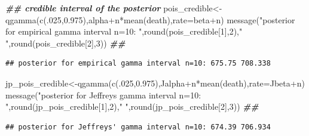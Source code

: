 \documentclass[
]{book}
\newenvironment{Shaded}{\begin{snugshade}}{\end{snugshade}}
\newcommand{\AttributeTok}[1]{\textcolor[rgb]{0.77,0.63,0.00}{#1}}
\newcommand{\DecValTok}[1]{\textcolor[rgb]{0.00,0.00,0.81}{#1}}
\newcommand{\DocumentationTok}[1]{\textcolor[rgb]{0.56,0.35,0.01}{\textbf{\textit{#1}}}}
\newcommand{\FloatTok}[1]{\textcolor[rgb]{0.00,0.00,0.81}{#1}}
\newcommand{\FunctionTok}[1]{\textcolor[rgb]{0.00,0.00,0.00}{#1}}
\newcommand{\NormalTok}[1]{#1}
\newcommand{\OtherTok}[1]{\textcolor[rgb]{0.56,0.35,0.01}{#1}}
\newcommand{\SpecialCharTok}[1]{\textcolor[rgb]{0.00,0.00,0.00}{#1}}
\newcommand{\StringTok}[1]{\textcolor[rgb]{0.31,0.60,0.02}{#1}}
\theoremstyle{definition}
\theoremstyle{definition}
\theoremstyle{definition}
\theoremstyle{definition}
\theoremstyle{remark}
\begin{document}
\begin{Shaded}
\begin{Highlighting}[]
 \DocumentationTok{\#\# credible interval of the posterior}
\NormalTok{ pois\_credible}\OtherTok{\textless{}{-}}\FunctionTok{qgamma}\NormalTok{(}\FunctionTok{c}\NormalTok{(.}\DecValTok{025}\NormalTok{,}\FloatTok{0.975}\NormalTok{),alpha}\SpecialCharTok{+}\NormalTok{n}\SpecialCharTok{*}\FunctionTok{mean}\NormalTok{(death),}\AttributeTok{rate=}\NormalTok{beta}\SpecialCharTok{+}\NormalTok{n)}
 \FunctionTok{message}\NormalTok{(}\StringTok{"posterior for empirical gamma interval n=10: "}\NormalTok{,}\FunctionTok{round}\NormalTok{(pois\_credible[}\DecValTok{1}\NormalTok{],}\DecValTok{2}\NormalTok{),}\StringTok{" "}\NormalTok{,}\FunctionTok{round}\NormalTok{(pois\_credible[}\DecValTok{2}\NormalTok{],}\DecValTok{3}\NormalTok{)) }\DocumentationTok{\#\# }
\end{Highlighting}
\end{Shaded}

\begin{verbatim}
## posterior for empirical gamma interval n=10: 675.75 708.338
\end{verbatim}

\begin{Shaded}
\begin{Highlighting}[]
\NormalTok{ jp\_pois\_credible}\OtherTok{\textless{}{-}}\FunctionTok{qgamma}\NormalTok{(}\FunctionTok{c}\NormalTok{(.}\DecValTok{025}\NormalTok{,}\FloatTok{0.975}\NormalTok{),Jalpha}\SpecialCharTok{+}\NormalTok{n}\SpecialCharTok{*}\FunctionTok{mean}\NormalTok{(death),}\AttributeTok{rate=}\NormalTok{Jbeta}\SpecialCharTok{+}\NormalTok{n)}
 \FunctionTok{message}\NormalTok{(}\StringTok{"posterior for Jeffreys\textquotesingle{} gamma interval n=10: "}\NormalTok{,}\FunctionTok{round}\NormalTok{(jp\_pois\_credible[}\DecValTok{1}\NormalTok{],}\DecValTok{2}\NormalTok{),}\StringTok{" "}\NormalTok{,}\FunctionTok{round}\NormalTok{(jp\_pois\_credible[}\DecValTok{2}\NormalTok{],}\DecValTok{3}\NormalTok{)) }\DocumentationTok{\#\# }
\end{Highlighting}
\end{Shaded}

\begin{verbatim}
## posterior for Jeffreys' gamma interval n=10: 674.39 706.934
\end{verbatim}
\end{document}
